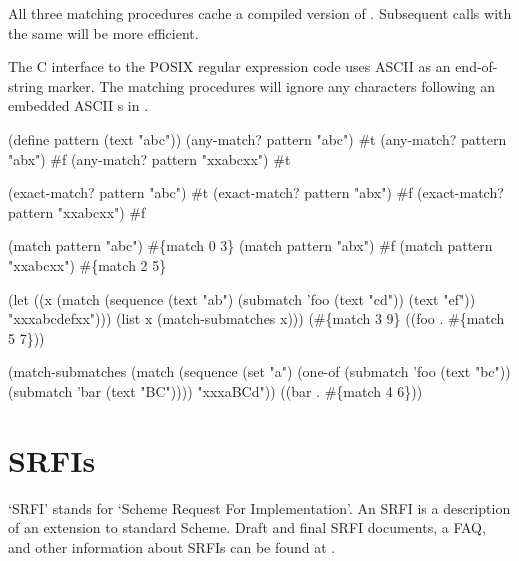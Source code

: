 All three matching procedures cache a compiled version of .
Subsequent calls with the same  will be more efficient.

The C interface to the POSIX regular expression code uses ASCII 
 as an end-of-string marker.
The matching procedures will ignore any characters following an
 embedded ASCII s in .

\begin{example}
(define pattern (text "abc"))
(any-match? pattern "abc")         \evalsto #t
(any-match? pattern "abx")         \evalsto #f
(any-match? pattern "xxabcxx")     \evalsto #t

(exact-match? pattern "abc")       \evalsto #t
(exact-match? pattern "abx")       \evalsto #f
(exact-match? pattern "xxabcxx")   \evalsto #f

(match pattern "abc")              \evalsto #\{match 0 3\}
(match pattern "abx")              \evalsto #f
(match pattern "xxabcxx")          \evalsto #\{match 2 5\}

(let ((x (match (sequence (text "ab")
                          (submatch 'foo (text "cd"))
                          (text "ef"))
                "xxxabcdefxx")))
  (list x (match-submatches x)))
  \evalsto (#\{match 3 9\} ((foo . #\{match 5 7\}))

(match-submatches
  (match (sequence
           (set "a")
           (one-of (submatch 'foo (text "bc"))
                   (submatch 'bar (text "BC"))))
         "xxxaBCd"))
  \evalsto ((bar . #\{match 4 6\}))
\end{example}

\section{SRFIs}

`SRFI' stands for `Scheme Request For Implementation'.
An SRFI is a description of an extension to standard Scheme.
Draft and final SRFI documents, a FAQ, and other information about SRFIs
 can be found at
.

